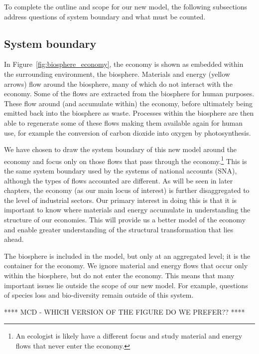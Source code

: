 To complete the outline and scope for our new model, 
the following subsections address
questions of system boundary and what must be counted.


\subsection{System boundary}
\label{sec:system_boundary}

In Figure~\ref{fig:biosphere_economy},
the economy is shown as embedded within the surrounding environment,
the biosphere.
Materials and energy (yellow arrows) flow around the biosphere,
many of which do not interact with the economy.
Some of the flows are extracted from the biosphere for human purposes.
These flow around (and accumulate within) the economy,
before ultimately being emitted back into the biosphere as waste.
Processes within the biosphere are then able to regenerate some of these
flows making them available again for human use,
for example the conversion of carbon dioxide into oxygen by photosynthesis.

We have chosen to draw the system boundary of this new model around the economy
and focus only on those flows that pass through the economy.\footnote{An ecologist
	is likely have a different focus 
	and study material and energy flows that never enter the economy.
	}
This is the same system boundary used by the
systems of national accounts (SNA),
although the types of flows accounted are different.
As will be seen in later chapters,
the economy (as our main locus of interest) is further disaggregated 
to the level of industrial sectors.
Our primary interest in doing this is that it is important 
to know where materials and energy accumulate in understanding
the structure of our economies.
This will provide us a better model of the economy and
enable greater understanding of the structural transformation that lies ahead.

The biosphere is included in the model, but only at an aggregated level;
it is the container for the economy. 
We ignore material and energy flows that occur only within the biosphere,
but do not enter the economy.
This means that many important issues lie outside the scope of our new model. 
For example, questions of species loss and
bio-diversity remain outside of this system. 

**** MCD - WHICH VERSION OF THE FIGURE DO WE PREFER?? ****



